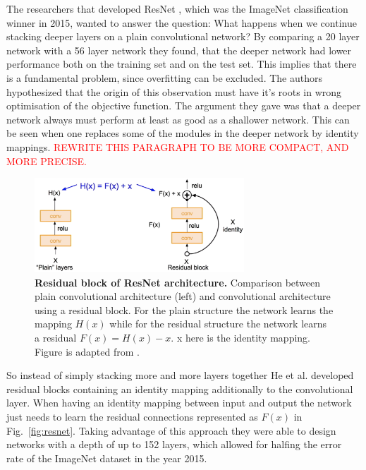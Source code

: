 The researchers that developed ResNet \parencite{he2015}, which was the ImageNet classification winner in 2015, wanted to answer the question: What happens when we continue stacking deeper layers on a plain convolutional network? By comparing a 20 layer network with a 56 layer network they found, that the deeper network had lower performance both on the training set and on the test set. This implies that there is a fundamental problem, since overfitting can be excluded. The authors hypothesized that the origin of this observation must have it's roots in wrong optimisation of the objective function. The argument they gave was that a deeper network always must perform at least as good as a shallower network. This can be seen when one replaces some of the modules in the deeper network by identity mappings. \textcolor{red}{REWRITE THIS PARAGRAPH TO BE MORE COMPACT, AND MORE PRECISE.}

\begin{figure}[h!]
	\centering
	\captionsetup{width=1\linewidth}
	\includegraphics[width=0.7\textwidth]{Figures/residual_modul.png}
	\caption{\textbf{Residual block of ResNet architecture.} Comparison between plain convolutional architecture (left) and convolutional architecture using a residual block. For the plain structure the network learns the mapping $H(x)$ while for the residual structure the network learns a residual $F(x) = H(x) - x$. x here is the identity mapping. Figure is adapted from \parencite{cs231}.}
	\label{fig:residual}
\end{figure}

So instead of simply stacking more and more layers together He et al. developed residual blocks containing an identity mapping additionally to the convolutional layer. When having an identity mapping between input and output the network just needs to learn the residual connections represented as $F(x)$ in Fig.~\ref{fig:resnet}.
Taking advantage of this approach they were able to design networks with a depth of up to 152 layers, which allowed for halfing the error rate of the ImageNet dataset in the year 2015. 

